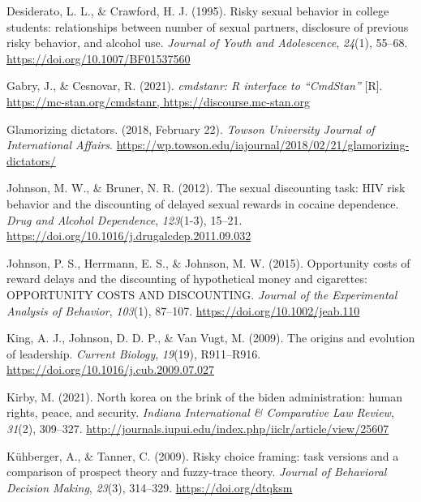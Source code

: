 \documentclass[
  donotrepeattitle,doc, 12pt, a4paper,floatsintext]{apa7}
\newlength{\cslhangindent}
\newlength{\cslentryspacingunit} %
\newenvironment{CSLReferences}[2] %
 {%
  \setlength{\parindent}{0pt}
  \ifodd #1
  \let\oldpar\par
  \def\par{\hangindent=\cslhangindent\oldpar}
  \fi
  \setlength{\parskip}{#2\cslentryspacingunit}
 }%
 {}
\begin{document}
\begin{CSLReferences}{1}{0}
\leavevmode{}%
Desiderato, L. L., \& Crawford, H. J. (1995). Risky sexual behavior in college students: relationships between number of sexual partners, disclosure of previous risky behavior, and alcohol use. \emph{Journal of Youth and Adolescence}, \emph{24}(1), 55--68. \url{https://doi.org/10.1007/BF01537560}

\leavevmode{}%
Gabry, J., \& Cesnovar, R. (2021). \emph{cmdstanr: R interface to {``CmdStan''}} {[}R{]}. \href{https://mc-stan.org/cmdstanr,\%20https://discourse.mc-stan.org}{https://mc-stan.org/cmdstanr, https://discourse.mc-stan.org}

\leavevmode{}%
Glamorizing dictators. (2018, February 22). \emph{Towson University Journal of International Affairs}. \url{https://wp.towson.edu/iajournal/2018/02/21/glamorizing-dictators/}

\leavevmode{}%
Johnson, M. W., \& Bruner, N. R. (2012). The sexual discounting task: HIV risk behavior and the discounting of delayed sexual rewards in cocaine dependence. \emph{Drug and Alcohol Dependence}, \emph{123}(1-3), 15--21. \url{https://doi.org/10.1016/j.drugalcdep.2011.09.032}

\leavevmode{}%
Johnson, P. S., Herrmann, E. S., \& Johnson, M. W. (2015). Opportunity costs of reward delays and the discounting of hypothetical money and cigarettes: OPPORTUNITY COSTS AND DISCOUNTING. \emph{Journal of the Experimental Analysis of Behavior}, \emph{103}(1), 87--107. \url{https://doi.org/10.1002/jeab.110}

\leavevmode{}%
King, A. J., Johnson, D. D. P., \& Van Vugt, M. (2009). The origins and evolution of leadership. \emph{Current Biology}, \emph{19}(19), R911--R916. \url{https://doi.org/10.1016/j.cub.2009.07.027}

\leavevmode{}%
Kirby, M. (2021). North korea on the brink of the biden administration: human rights, peace, and security. \emph{Indiana International \& Comparative Law Review}, \emph{31}(2), 309--327. \url{http://journals.iupui.edu/index.php/iiclr/article/view/25607}

\leavevmode{}%
Kühberger, A., \& Tanner, C. (2009). Risky choice framing: task versions and a comparison of prospect theory and fuzzy-trace theory. \emph{Journal of Behavioral Decision Making}, \emph{23}(3), 314--329. \url{https://doi.org/dtqksm}


\end{CSLReferences}
\end{document}
